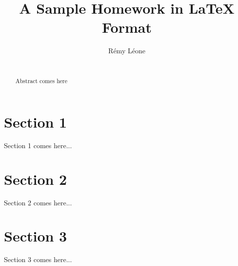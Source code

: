 \documentclass{sig-alternate-10pt}
\begin{document}
\title{A Sample Homework in LaTeX Format}


\author{
\alignauthor
Rémy Léone\\
       \\
}

\maketitle

\begin{abstract}
Abstract comes here
\end{abstract}


\section{Section 1}

Section 1 comes here...


\section{Section 2}

\cite{overcite} Section 2 comes here...


\section{Section 3}

Section 3 comes here...




\end{document}
